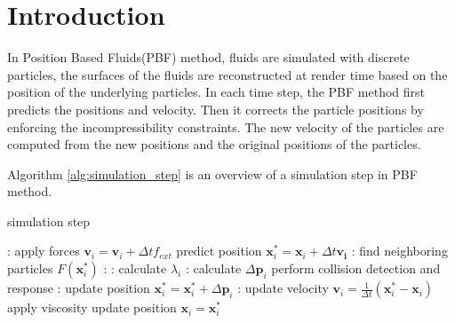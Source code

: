 \documentclass[sigconf]{acmart}
\newcommand{\vect}[1]{\boldsymbol{#1}}
\begin{document}

\maketitle

\section{Introduction}
In Position Based Fluids(PBF) method, fluids are simulated with discrete particles, the surfaces of the fluids are reconstructed at render time based on the position of the underlying particles. In each time step, the PBF method first predicts the positions and velocity. Then it corrects the particle positions by enforcing the incompressibility constraints. The new velocity of the particles are computed from the new positions and the original positions of the particles.

Algorithm \ref{alg:simulation_step} is an overview of a simulation step in PBF method.

\begin{algorithm}
  \caption{simulation step}
  \label{alg:simulation_step}
  \begin{algorithmic}[1]
    : 
    \State apply forces $\vect{v}_i = \vect{v}_i + \Delta t f_{ext}$
    \State predict position $\vect{x}_i^* = \vect{x}_i + \Delta t \vect{v_i}$
    \EndFor
    :
    \State find neighboring particles $F(\vect{x}_i^*)$
    \EndFor
    : 
      :
      \State calculate $\lambda_i$
      \EndFor
      :
      \State calculate $\Delta \vect{p}_i$
      \State perform collision detection and response
      \EndFor
      :
      \State update position $\vect{x}_i^* = \vect{x}_i^* + \Delta \vect{p}_i$
      \EndFor
    \EndWhile
    :
    \State update velocity $\vect{v}_i = \frac{1}{\Delta t}(\vect{x}_i^*-\vect{x}_i)$
    \State apply viscosity
    \State update position $\vect{x}_i = \vect{x}_i^*$
      \EndFor
  \end{algorithmic}
\end{algorithm}
\end{document}
